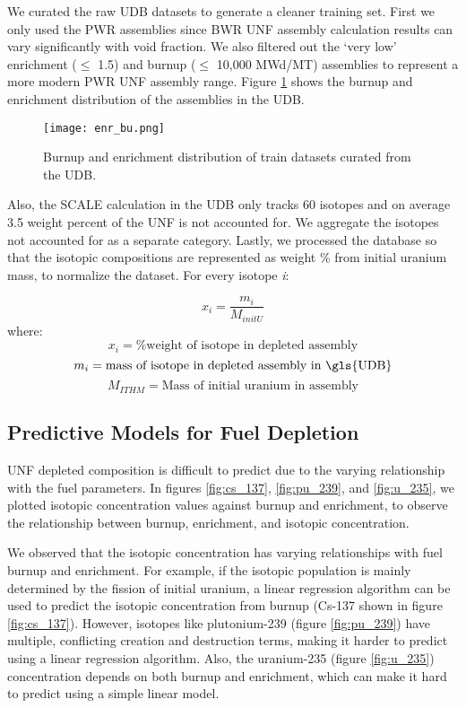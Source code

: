 We curated the raw \gls{UDB} datasets to generate
a cleaner training set. First we only used the 
\gls{PWR} assemblies since \gls{BWR} \gls{UNF} assembly
calculation results can vary significantly with void fraction.
We also filtered out the
`very low' enrichment ($\leq$ 1.5) and
burnup ($\leq$ 10,000 MWd/MT)
assemblies to represent a more modern \gls{PWR} \gls{UNF}
assembly range. Figure \ref{fig:enr_bu} shows the
burnup and enrichment distribution of the assemblies in the
\gls{UDB}.


\begin{figure}
    \centering
    \texttt{[image: enr\_bu.png]}
    \caption{Burnup and enrichment distribution of train
             datasets curated from the \gls{UDB}.}
    \label{fig:enr_bu}
\end{figure}


Also, the SCALE calculation in the \gls{UDB} only tracks 60 isotopes
and on average 3.5 weight percent of the \gls{UNF} is not accounted for. We
aggregate the isotopes not accounted for as a separate category. Lastly,
we processed the database so that the isotopic compositions are 
represented as weight \% from initial uranium mass, to normalize
the dataset. For every isotope \textit{i}:

\begin{equation}
x_i = \frac{m_i}{M_{initU}}
\end{equation}
where:
\[
x_i = \text{\% weight of isotope in depleted assembly}
\]
\[
m_i = \text{mass of isotope in depleted assembly in \gls{UDB}}
\]
\[
M_{ITHM} = \text{Mass of initial uranium in assembly}
\]


\subsection{Predictive Models for Fuel Depletion}

\gls{UNF} depleted composition is difficult to predict
due to the varying relationship with the fuel parameters.
In figures \ref{fig:cs_137}, \ref{fig:pu_239}, and \ref{fig:u_235},
we plotted isotopic concentration values against
burnup and enrichment, to observe the relationship between
burnup, enrichment, and isotopic concentration.

We observed that the isotopic concentration has varying
relationships with fuel burnup and enrichment.
For example, if the isotopic population is mainly determined by
the fission of initial uranium, a linear regression algorithm
can be used to predict the isotopic concentration from burnup
(Cs-137 shown in figure \ref{fig:cs_137}).
However, isotopes like plutonium-239 (figure \ref{fig:pu_239}) have multiple, conflicting creation
and destruction terms, making it harder to predict using a
linear regression algorithm. Also, the uranium-235 (figure \ref{fig:u_235}) concentration
depends on both burnup and enrichment, which can make it
hard to predict using a simple linear model.

